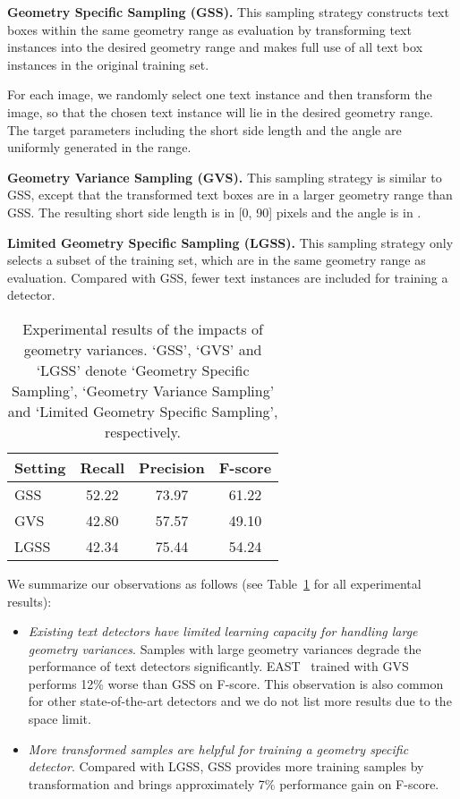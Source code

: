 \documentclass[10pt,twocolumn,letterpaper]{article}
\begin{document}
\textbf{Geometry Specific Sampling (GSS). }
This sampling strategy constructs text boxes within the same geometry range as evaluation by transforming text instances into the desired geometry range and makes full use of all text box instances in the original training set.

For each image, we randomly select one text instance and then transform the image, so that the chosen text instance will lie in the desired geometry range. The target parameters including the short side length and the angle are uniformly generated in the range.


\textbf{Geometry Variance Sampling (GVS).}
This sampling strategy is similar to GSS, except that the transformed text boxes are in a larger geometry range than GSS. The resulting short side length is in [0, 90] pixels and the
angle is in .


\textbf{Limited Geometry  Specific Sampling (LGSS).}
This sampling strategy only selects a subset of the training set, which are in the same geometry range as evaluation. Compared with GSS, fewer text instances are included for training a detector.


\begin{table}[b]
\renewcommand{\arraystretch}{1.1}
\centering
\caption{Experimental results of the impacts of geometry variances. `GSS', `GVS' and `LGSS' denote `Geometry Specific Sampling', `Geometry Variance Sampling' and `Limited Geometry  Specific Sampling', respectively.}\label{table:investigation}
    \begin{tabular}{|l|c|c|c|}
      \hline

       Setting  & Recall & Precision  & F-score \\
       \hline
       GSS &  52.22 & 73.97 & 61.22 \\
       GVS & 42.80 & 57.57 & 49.10 \\
       LGSS & 42.34 & 75.44 & 54.24 \\
      \hline
      \end{tabular}
\end{table}

We summarize our observations as follows (see Table~\ref{table:investigation} for all experimental results):
\begin{itemize}
\item \textit{Existing text detectors have limited learning capacity for handling large geometry variances}. Samples with large geometry variances degrade the performance of text detectors significantly. EAST~\cite{Zhou2017} trained with GVS performs 12\% worse than GSS on F-score. This observation is also common for other state-of-the-art detectors and we do not list more results due to the space limit.
\item \textit{More transformed samples are helpful for training a geometry specific detector}. Compared with LGSS, GSS provides more training samples by transformation and brings approximately 7\% performance gain on F-score.
\end{itemize}
\end{document}
